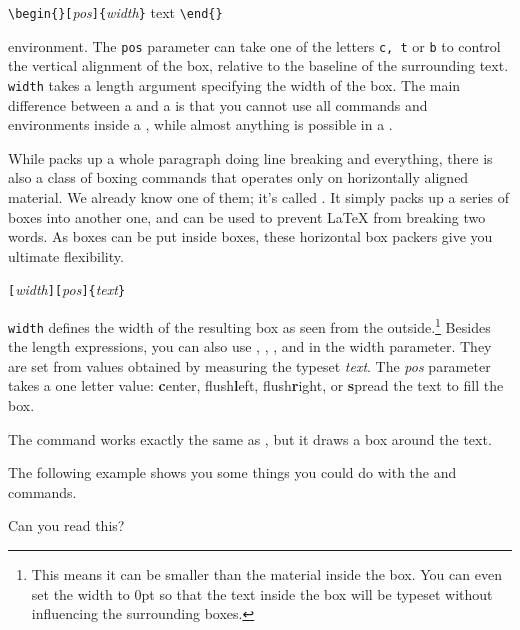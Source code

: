 \begin{lscommand}
  \verb|\begin{|\verb|}[|\emph{pos}\verb|]{|\emph{width}\verb|}| text
  \verb|\end{|\verb|}|
\end{lscommand}

\noindent environment. The \texttt{pos} parameter can take one of the letters
\texttt{c, t} or \texttt{b} to control the vertical alignment of the box,
relative to the baseline of the surrounding text. \texttt{width} takes
a length argument specifying the width of the box. The main difference
between a  and a  is that you cannot use all commands
and environments inside a , while almost anything is possible in
a .

While  packs up a whole paragraph doing line breaking and
everything, there is also a class of boxing commands that operates
only on horizontally aligned material. We already know one of them;
it's called . It simply packs up a series of boxes into
another one, and can be used to prevent \LaTeX{} from breaking two
words. As boxes can be put inside boxes, these horizontal box packers
give you ultimate flexibility.

\begin{lscommand}
  \verb|[|\emph{width}\verb|][|\emph{pos}\verb|]{|\emph{text}\verb|}|
\end{lscommand}

\noindent \texttt{width} defines the width of the resulting box as
seen from the outside.\footnote{This means it can be smaller than the
  material inside the box. You can even set the
  width to 0pt so that the text inside the box will be typeset without
  influencing the surrounding boxes.}  Besides the length
expressions, you can also use , , , and
 in the width parameter. They are set from values
obtained by measuring the typeset \emph{text}. The \emph{pos} parameter takes
a one letter value: \textbf{c}enter, flush\textbf{l}eft,
flush\textbf{r}ight, or \textbf{s}pread the text to fill the box.

The command  works exactly the same as , but
it draws a box around the text.

The following example shows you some things you could do with
the  and  commands.

\begin{example}
\par
{}\par
{} \par
{} \par
{}
Can you read this?
\end{example}

